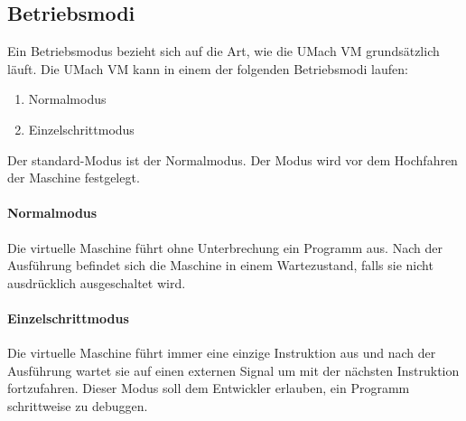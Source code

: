 \subsection{Betriebsmodi}
\label{subsec:Betriebsmodi}

Ein \gls{Betriebsmodus} bezieht sich auf die Art, wie die UMach VM grundsätzlich
läuft. Die UMach VM kann in einem der folgenden Betriebsmodi laufen:

\begin{enumerate}
  \item Normalmodus
  \item Einzelschrittmodus
\end{enumerate}

Der standard-Modus ist der Normalmodus.
Der Modus wird vor dem Hochfahren der Maschine festgelegt.

\paragraph{Normalmodus} Die virtuelle Maschine führt ohne Unterbrechung ein
Programm aus. Nach der Ausführung befindet sich die Maschine in einem
Wartezustand, falls sie nicht ausdrücklich ausgeschaltet wird.

\paragraph{Einzelschrittmodus} Die virtuelle Maschine führt immer eine einzige
Instruktion aus und nach der Ausführung wartet sie auf einen externen Signal um
mit der nächsten Instruktion fortzufahren. Dieser Modus soll dem Entwickler
erlauben, ein Programm schrittweise zu debuggen.


